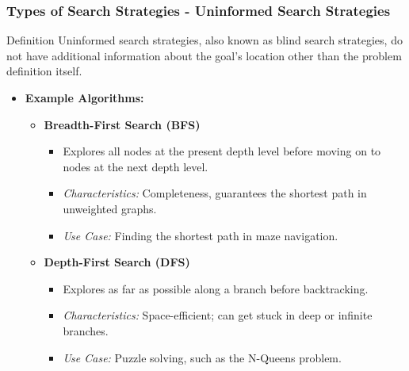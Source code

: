 \documentclass[aspectratio=169]{beamer}
\begin{document}
\begin{frame}[fragile]
    \frametitle{Types of Search Strategies - Uninformed Search Strategies}
    \begin{block}{Definition}
        Uninformed search strategies, also known as blind search strategies, do not have additional information about the goal's location other than the problem definition itself.
    \end{block}

    \begin{itemize}
        \item \textbf{Example Algorithms:}
        \begin{itemize}
            \item \textbf{Breadth-First Search (BFS)}
                \begin{itemize}
                    \item Explores all nodes at the present depth level before moving on to nodes at the next depth level.
                    \item \textit{Characteristics:} Completeness, guarantees the shortest path in unweighted graphs.
                    \item \textit{Use Case:} Finding the shortest path in maze navigation.
                \end{itemize}
            \item \textbf{Depth-First Search (DFS)}
                \begin{itemize}
                    \item Explores as far as possible along a branch before backtracking.
                    \item \textit{Characteristics:} Space-efficient; can get stuck in deep or infinite branches.
                    \item \textit{Use Case:} Puzzle solving, such as the N-Queens problem.
                \end{itemize}
        \end{itemize}
    \end{itemize}
\end{frame}
\end{document}
